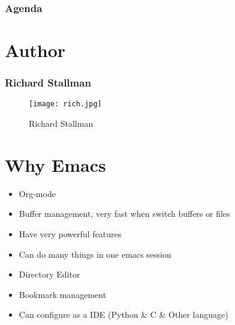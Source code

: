 \iffalse
\AtBeginSubsubsection[]
{
  \begin{frame}<beamer>
    \frametitle{Agenda}
    \begin{multicols}{2}
	\setcounter{tocdepth}{3}
    \tableofcontents[currentsection,currentsubsection]
    \end{multicols}
  \end{frame}
}
\fi




\begin{frame}
  \titlepage
\end{frame}

\begin{frame}[plain]
  \frametitle{Agenda}
  \setcounter{tocdepth}{2}
  \tableofcontents
\end{frame}

\section{Author}
\begin{frame}
	\frametitle{Richard Stallman}
	\begin{figure}[htbp]
    \centering
    \texttt{[image: rich.jpg]}
    \caption{Richard Stallman}
    \label{fig:power}
    \end{figure}
\end{frame}
\section{Why Emacs}
\begin{frame}
    \begin{itemize}[<+-|alert@+>]
         \item Org-mode
         \item Buffer management, very fast when switch buffers or files
         \item Have very powerful features
         \item Can do many things in one emacs session
         \item Directory Editor
         \item Bookmark management
         \item Can configure as a IDE (Python \& C \& Other language)
    \end{itemize}
\end{frame}
